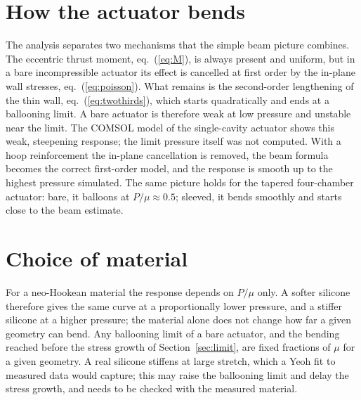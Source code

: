 \documentclass[12pt,a4paper,oneside]{report}
\numberwithin{equation}{chapter}
\numberwithin{figure}{chapter}
\numberwithin{table}{chapter}
\begin{document}
\section{How the actuator bends}
The analysis separates two mechanisms that the simple beam picture combines. The eccentric thrust moment,
eq.~(\ref{eq:M}), is always present and uniform, but in a bare incompressible actuator its effect is cancelled
at first order by the in-plane wall stresses, eq.~(\ref{eq:poisson}). What remains is the second-order
lengthening of the thin wall, eq.~(\ref{eq:twothirds}), which starts quadratically and ends at a ballooning
limit. A bare actuator is therefore weak at low pressure and unstable near the limit. The COMSOL model of the
single-cavity actuator shows this weak, steepening response; the limit pressure itself was not computed. With
a hoop reinforcement the in-plane cancellation is removed, the beam formula becomes the correct first-order
model, and the response is smooth up to the highest pressure simulated. The same picture holds for the tapered four-chamber actuator: bare, it balloons at
$P/\mu\approx0.5$; sleeved, it bends smoothly and starts close to the beam estimate.

\section{Choice of material}
For a neo-Hookean material the response depends on $P/\mu$ only. A softer silicone therefore gives the same
curve at a proportionally lower pressure, and a stiffer silicone at a higher pressure; the material alone
does not change how far a given geometry can bend. Any ballooning limit of a bare actuator, and the bending
reached before the stress growth of Section~\ref{sec:limit}, are fixed fractions of $\mu$ for a given geometry.
A real silicone stiffens at large stretch, which a Yeoh fit to measured data would capture; this may raise the
ballooning limit and delay the stress growth, and needs to be checked with the measured material.
\end{document}
